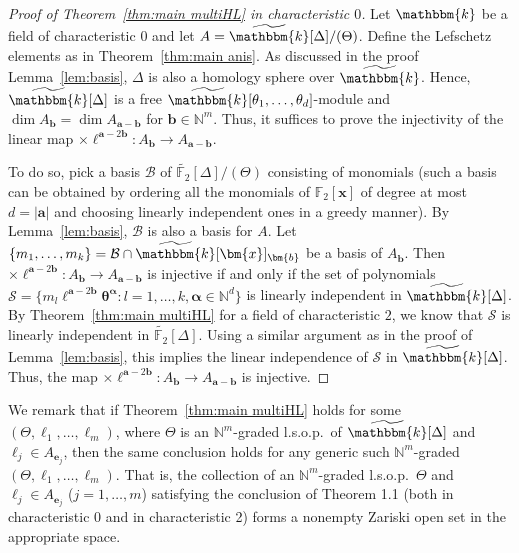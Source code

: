 \begin{proof}[Proof of Theorem~\ref{thm:main multiHL} in characteristic $0$]
Let $\mathbbm{k}$ be a field of characteristic $0$ and let $A=\widetilde{\mathbbm{k}}[\Delta]/(\Theta)$.
Define the Lefschetz elements as in Theorem~\ref{thm:main anis}.
As discussed in the proof Lemma~\ref{lem:basis}, $\Delta$ is also a homology sphere over $\widetilde{\mathbbm{k}}$.
Hence, $\widetilde{\mathbbm{k}}[\Delta]$ is a free $\widetilde{\mathbbm{k}}[\theta_1,\ldots,\theta_d]$-module and $\dim A_{\bm{b}}=\dim A_{\bm{a}-\bm{b}}$ for $\bm{b} \in \mathbb{N}^m$.
Thus, it suffices to prove the injectivity of the linear map $\times\bm{\ell}^{\bm{a}-2\bm{b}}:A_{\bm{b}} \rightarrow A_{\bm{a}-\bm{b}}$.

To do so, pick a basis $\mathcal{B}$ of $\widetilde{\mathbb{F}_2}[\Delta]/(\Theta)$ consisting of monomials (such a basis can be obtained by ordering all the monomials of $\mathbb{F}_2[\bm{x}]$ of degree at most $d=|\bm{a}|$ and choosing linearly independent ones in a greedy manner).
By Lemma~\ref{lem:basis}, $\mathcal{B}$ is also a basis for $A$. 
Let $\{m_1,\ldots,m_k\}=\mathcal{B} \cap \widetilde{\mathbbm{k}}[\bm{x}]_{\bm{b}}$ be a basis of $A_{\bm{b}}$.
Then $\times\bm{\ell}^{\bm{a}-2\bm{b}}:A_{\bm{b}} \rightarrow A_{\bm{a}-\bm{b}}$ is injective if and only if the set of polynomials $\mathcal{S}=\{m_l\bm{\ell}^{\bm{a}-2\bm{b}} \bm{\theta}^{\bm{\alpha}}: l=1,\ldots,k, \bm{\alpha} \in \mathbb{N}^d\}$ is linearly independent in $\widetilde{\mathbbm{k}}[\Delta]$.
By Theorem~\ref{thm:main multiHL} for a field of characteristic $2$, we know that $\mathcal{S}$ is linearly independent in $\widetilde{\mathbb{F}_2}[\Delta]$. 
Using a similar argument as in the proof of Lemma~\ref{lem:basis}, this implies the linear independence of $\mathcal{S}$ in $\widetilde{\mathbbm{k}}[\Delta]$.
Thus, the map $\times\bm{\ell}^{\bm{a}-2\bm{b}}:A_{\bm{b}} \rightarrow A_{\bm{a}-\bm{b}}$ is injective.
\end{proof}

\begin{rema} \label{rem:Zariski}
    We remark that if Theorem~\ref{thm:main multiHL} holds for some $(\Theta,\ell_1,\ldots,\ell_m)$, where $\Theta$ is an $\mathbb{N}^m$-graded l.s.o.p.~of $\widetilde{\mathbbm{k}}[\Delta]$ and $\ell_j \in A_{\bm{e}_j}$, then the same conclusion holds for any generic such $\mathbb{N}^m$-graded $(\Theta,\ell_1,\ldots,\ell_m)$.
    That is, the collection of an $\mathbb{N}^m$-graded l.s.o.p.~$\Theta$ and $\ell_j \in A_{\bm{e}_j}$ ($j=1,\ldots,m$) satisfying the conclusion of Theorem 1.1 (both in characteristic 0 and in characteristic 2) forms a nonempty Zariski open set in the appropriate space.
\end{rema}

